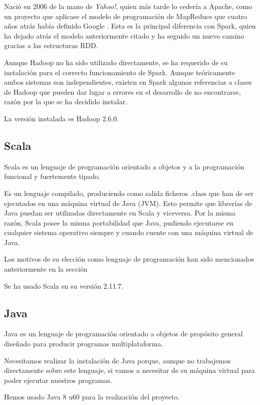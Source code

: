 Nació en 2006 de la mano de \textit{Yahoo!}, quien más tarde lo cedería a Apache, como un proyecto que aplicase el modelo de programación de MapReduce que cuatro años atrás había definido Google \cite{DatabricksSlides}. Esta es la principal diferencia con Spark, quien ha dejado atrás el modelo anteriormente citado y ha seguido un nuevo camino gracias a las estructuras RDD.

Aunque Hadoop no ha sido utilizado directamente, se ha requerido de su instalación para el correcto funcionamiento de Spark. Aunque teóricamente ambos sistemas son independientes, existen en Spark algunas referencias a clases de Hadoop que pueden dar lugar a errores en el desarrollo de no encontrarse, razón por la que se ha decidido instalar.

La versión instalada es Hadoop 2.6.0.

\subsection{Scala}
Scala es un lenguaje de programación orientado a objetos y a la programación funcional y fuertemente tipado.

Es un lenguaje compilado, produciendo como salida ficheros .class que han de ser ejecutados en una máquina virtual de Java (JVM). Esto permite que librerías de Java puedan ser utilizadas directamente en Scala y viceversa. Por la misma razón, Scala posee la misma portabilidad que Java, pudiendo ejecutarse en cualquier sistema operativo siempre y cuando cuente con una máquina virtual de Java. 

Los motivos de su elección como lenguaje de programación han sido mencionados anteriormente en la sección 

Se ha usado Scala en su versión 2.11.7.

\subsection{Java}

Java es un lenguaje de programación orientado a objetos de propósito general diseñado para producir programas multiplataforma.

Necesitamos realizar la instalación de Java porque, aunque no trabajemos directamente sobre este lenguaje, si vamos a necesitar de su máquina virtual para poder ejecutar nuestros programas.

Hemos usado Java 8 u60 para la realización del proyecto.

